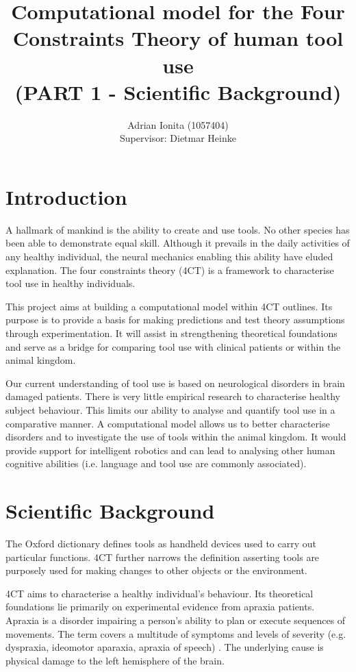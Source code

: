 \documentclass[11]{article}
\title{
  Computational model for the Four Constraints Theory of human tool use\\  
  \setlength{\parskip}{0.5em}  
  \normalsize (PART 1 - Scientific Background)
  }
\date{}
\author{Adrian Ionita (1057404)\\
Supervisor: Dietmar Heinke}
\begin{document}
\maketitle 	

\section{Introduction} 

A hallmark of mankind is the ability to create and use tools.
No other species has been able to demonstrate equal skill. 
Although it prevails in the daily activities of any healthy individual, the neural mechanics enabling this ability have eluded explanation. The four constraints theory (4CT) is a framework to characterise tool use\cite{osiurak2014} in healthy individuals.

This project aims at building a computational model within 4CT outlines. Its purpose is to provide a basis for making predictions and test theory assumptions through experimentation. It will assist in strengthening theoretical foundations and serve as a bridge for comparing tool use with clinical patients or within the animal kingdom.

Our current understanding of tool use is based on neurological disorders in brain damaged patients. There is very little empirical research to characterise healthy subject behaviour. This limits our ability to analyse and quantify tool use in a comparative manner. A computational model allows us to better characterise disorders and to investigate the use of tools within the animal kingdom. It would provide support for intelligent robotics and can lead to analysing other human cognitive abilities (i.e. language and tool use are commonly associated\cite{osiurak2014}\cite{fitch2010}).

\section{Scientific Background}
The Oxford dictionary defines tools as handheld devices used to carry out particular functions\cite{oxford}. 4CT further narrows the definition asserting tools are purposely used for making changes to other objects or the environment. 

4CT aims to characterise a healthy individual's behaviour. Its theoretical foundations lie primarily on experimental evidence from apraxia patients. Apraxia is a disorder impairing a person's ability to plan or execute sequences of movements. The term covers a multitude of symptoms and levels of severity (e.g. dyspraxia, ideomotor aparaxia, apraxia of speech) . The underlying cause is physical damage to the left hemisphere of the brain\cite{osiurak2013}.
\end{document}
